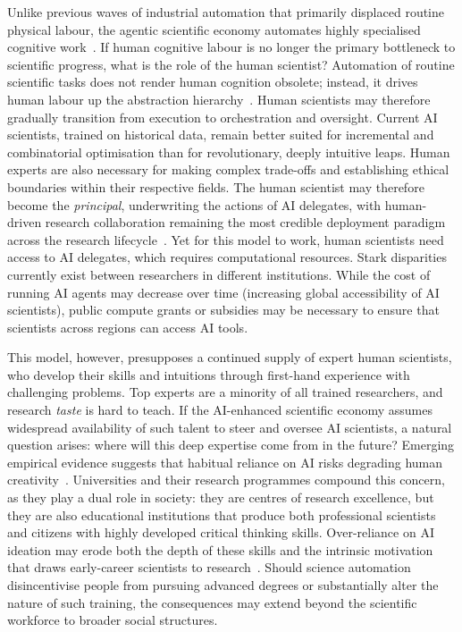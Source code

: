 \documentclass[11pt, a4paper, twocolumn, goog]{google}
\begin{document}
Unlike previous waves of industrial automation that primarily displaced routine physical labour, the agentic scientific economy automates highly specialised cognitive work~\citep{autor2015there, webb2019impact}. If human cognitive labour is no longer the primary bottleneck to scientific progress, what is the role of the human scientist? Automation of routine scientific tasks does not render human cognition obsolete; instead, it drives human labour up the abstraction hierarchy~\citep{acemoglu2019automation}. Human scientists may therefore gradually transition from execution to orchestration and oversight. Current AI scientists, trained on historical data, remain better suited for incremental and combinatorial optimisation than for revolutionary, deeply intuitive leaps. Human experts are also necessary for making complex trade-offs and establishing ethical boundaries within their respective fields. The human scientist may therefore become the \emph{principal}, underwriting the actions of AI delegates, with human-driven research collaboration remaining the most credible deployment paradigm across the research lifecycle~\citep{kong2026aiautoresearchroadmap}. Yet for this model to work, human scientists need access to AI delegates, which requires computational resources. Stark disparities currently exist between researchers in different institutions. While the cost of running AI agents may decrease over time (increasing global accessibility of AI scientists), public compute grants or subsidies may be necessary to ensure that scientists across regions can access AI tools.

This model, however, presupposes a continued supply of expert human scientists, who develop their skills and intuitions through first-hand experience with challenging problems. Top experts are a minority of all trained researchers, and research \emph{taste} is hard to teach. If the AI-enhanced scientific economy assumes widespread availability of such talent to steer and oversee AI scientists, a natural question arises: where will this deep expertise come from in the future? Emerging empirical evidence suggests that habitual reliance on AI risks degrading human creativity~\citep{ashkinaze2025ai}. Universities and their research programmes compound this concern, as they play a dual role in society: they are centres of research excellence, but they are also educational institutions that produce both professional scientists and citizens with highly developed critical thinking skills. Over-reliance on AI ideation may erode both the depth of these skills and the intrinsic motivation that draws early-career scientists to research~\citep{wu2025human}. Should science automation disincentivise people from pursuing advanced degrees or substantially alter the nature of such training, the consequences may extend beyond the scientific workforce to broader social structures. 
\end{document}
